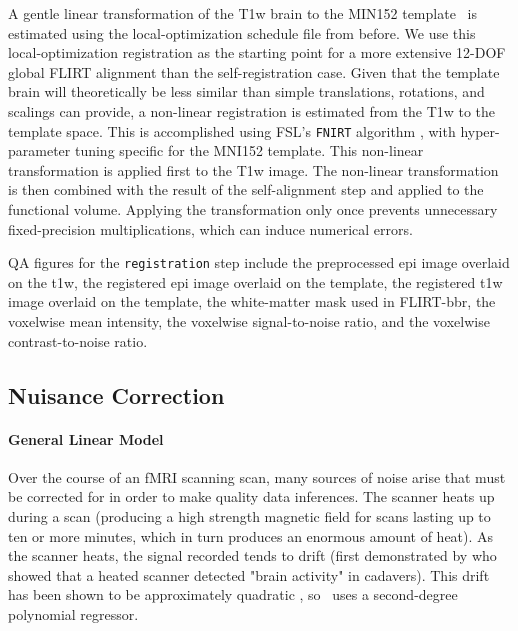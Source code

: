 \documentclass[11pt]{article}
\begin{document}
A gentle linear transformation of the T1w brain to the MIN152 template~ \cite{Grabner2006}  is estimated using the local-optimization schedule file from before. We use this local-optimization registration as the starting point for a more extensive 12-DOF global FLIRT alignment than the self-registration case. Given that the template brain will theoretically be less similar than simple translations, rotations, and scalings can provide, a non-linear registration is estimated from the T1w to the template space. This is accomplished using FSL's \texttt{FNIRT} algorithm \cite{Andersson2007}, with hyper-parameter tuning specific for the MNI152 template. This non-linear transformation is applied first to the T1w image. The non-linear transformation is then combined with the result of the self-alignment step and applied to the functional volume. Applying the transformation only once prevents unnecessary fixed-precision multiplications, which can induce numerical errors.

QA figures for the \texttt{registration} step include the preprocessed epi image overlaid on the t1w, the registered epi image overlaid on the template, the registered t1w image overlaid on the template, the white-matter mask used in FLIRT-bbr, the voxelwise mean intensity, the voxelwise signal-to-noise ratio, and the voxelwise contrast-to-noise ratio.

\subsection{Nuisance Correction}



\label{app:fnuis}
\paragraph{General Linear Model}

Over the course of an fMRI scanning scan, many sources of noise arise that must be corrected for in order to make quality data inferences. The scanner heats up during a scan (producing a high strength magnetic field for scans lasting up to ten or more minutes, which in turn produces an enormous amount of heat). As the scanner heats, the signal recorded tends to drift (first demonstrated by \cite{Smith1999} who showed that a heated scanner detected "brain activity" in cadavers). This drift has been shown to be approximately quadratic \cite{Tanabe}, so \ndmg~uses a second-degree polynomial regressor.
\end{document}
